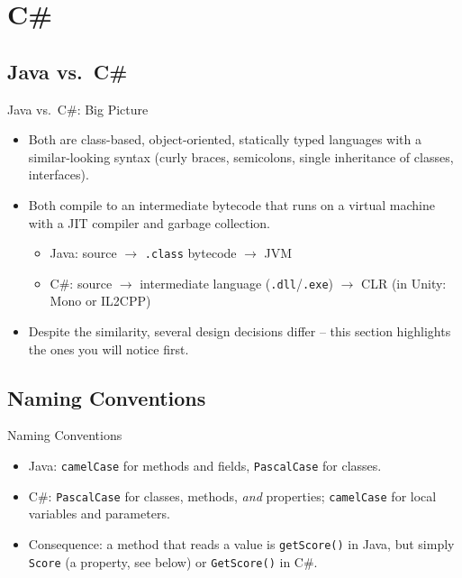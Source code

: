 
\section{C\#}


\subsection{Java vs.\ C\#}

\begin{frame}{Java vs.\ C\#: Big Picture}
  \begin{itemize}
    \item Both are class-based, object-oriented, statically typed languages
      with a similar-looking syntax (curly braces, semicolons, single
      inheritance of classes, interfaces).
    \item Both compile to an intermediate bytecode that runs on a virtual
      machine with a JIT compiler and garbage collection.
      \begin{itemize}
        \item Java: source $\to$ \texttt{.class} bytecode $\to$ JVM
        \item C\#: source $\to$ intermediate language (\texttt{.dll}/\texttt{.exe})
          $\to$ CLR (in Unity: Mono or IL2CPP)
      \end{itemize}
    \item Despite the similarity, several design decisions differ --
      this section highlights the ones you will notice first.
  \end{itemize}
\end{frame}

\subsection{Naming Conventions}

\begin{frame}{Naming Conventions}
  \begin{itemize}
    \item Java: \texttt{camelCase} for methods and fields,
      \texttt{PascalCase} for classes.
    \item C\#: \texttt{PascalCase} for classes, methods, \emph{and}
      properties; \texttt{camelCase} for local variables and parameters.
    \item Consequence: a method that reads a value is
      \texttt{getScore()} in Java, but simply \texttt{Score} (a property,
      see below) or \texttt{GetScore()} in C\#.
  \end{itemize}
\end{frame}

